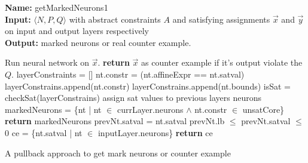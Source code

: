 \begin{algorithm}[t]
  \textbf{Name: } getMarkedNeurons1 \\
  \textbf{Input: } $\langle N,P,Q \rangle$ with abstract constraints $A$ and satisfying assignments $\overrightarrow{x}$ and $\overrightarrow{y}$ on input and output layers respectively\\
  \textbf{Output: } marked neurons or real counter example. 
  \begin{algorithmic}[1]
   \State Run neural network on $\overrightarrow{x}$.
   \State \textbf{return} $\overrightarrow{x}$ as counter example if it's output violate the $Q$. 
        \State layerConstraints = []
          \State nt.constr = (nt.affineExpr == nt.satval)
          \State layerConstrains.append(nt.constr)
        \EndFor
          \State layerConstrains.append(nt.bounds)
        \EndFor
        \State isSat = checkSat(layerConstrains)
          \State assign sat values to previous layers neurons
        \Else
          \State markedNeurons = \{nt | nt $\in$ currLayer.neurons $\land$ nt.constr $\in$ unsatCore\}
          \State \textbf{return } markedNeurons
        \EndIf
      \Else {}
            \State prevNt.satval = nt.satval  
          \Else
            \State prevNt.lb $\leq$ prevNt.satval $\leq$ 0 
          \EndIf
        \EndFor
      \EndIf
   \EndFor
    \State ce = \{nt.satval | nt $\in$ inputLayer.neurons\} 
    \State \textbf{return} ce
  \end{algorithmic}
  \caption{A pullback approach to get mark neurons or counter example}
  \label{algo:refine1}
\end{algorithm}


